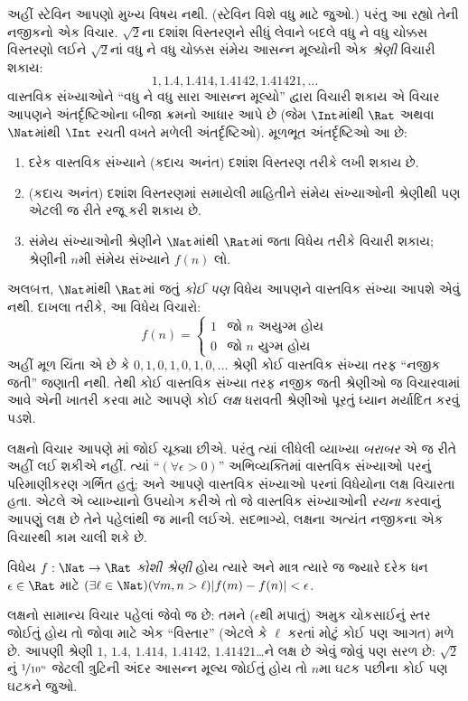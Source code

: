 અહીં સ્ટેવિન આપણો મુખ્ય વિષય નથી. (સ્ટેવિન વિશે વધુ માટે
\citealt{KatzKatz2012} જુઓ.) પરંતુ આ રહ્યો તેની નજીકનો એક વિચાર.
$\sqrt{2}$ના દશાંશ વિસ્તરણને સીધું લેવાને બદલે વધુ ને વધુ ચોક્કસ
વિસ્તરણો લઈને $\sqrt{2}$નાં વધુ ને વધુ ચોક્કસ સંમેય આસન્ન મૂલ્યોની
એક \emph{શ્રેણી} વિચારી શકાય:
\[
1, 1.4, 1.414, 1.4142, 1.41421,\ldots
\]
વાસ્તવિક સંખ્યાઓને ``વધુ ને વધુ સારા આસન્ન મૂલ્યો'' દ્વારા વિચારી
શકાય એ વિચાર આપણને અંતર્દૃષ્ટિઓના બીજા ક્રમનો આધાર આપે છે (જેમ
$\Int$માંથી $\Rat$ અથવા $\Nat$માંથી $\Int$ રચતી વખતે મળેલી
અંતર્દૃષ્ટિઓ). મૂળભૂત અંતર્દૃષ્ટિઓ આ છે:
\begin{enumerate}
	\item દરેક વાસ્તવિક સંખ્યાને (કદાચ અનંત) દશાંશ વિસ્તરણ તરીકે લખી
	શકાય છે.
	\item (કદાચ અનંત) દશાંશ વિસ્તરણમાં સમાયેલી માહિતીને સંમેય સંખ્યાઓની
	શ્રેણીથી પણ એટલી જ રીતે રજૂ કરી શકાય છે.
	\item સંમેય સંખ્યાઓની શ્રેણીને $\Nat$માંથી $\Rat$માં જતા વિધેય
	તરીકે વિચારી શકાય; શ્રેણીની $n$મી સંમેય સંખ્યાને $f(n)$ લો.
\end{enumerate}
અલબત્ત, $\Nat$માંથી $\Rat$માં જતું \emph{કોઈ પણ} વિધેય આપણને વાસ્તવિક
સંખ્યા આપશે એવું નથી. દાખલા તરીકે, આ વિધેય વિચારો:
\[
	f(n) =\begin{cases}
			1 & \text{જો }n\text{ અયુગ્મ હોય}\\
			0 &\text{જો }n\text{ યુગ્મ હોય}
		\end{cases}
\]
અહીં મૂળ ચિંતા એ છે કે $0,1,0,1,0,1,0,\ldots$ શ્રેણી કોઈ વાસ્તવિક
સંખ્યા તરફ ``નજીક જતી'' જણાતી નથી. તેથી કોઈ વાસ્તવિક સંખ્યા તરફ
નજીક જતી શ્રેણીઓ જ વિચારવામાં આવે એની ખાતરી કરવા માટે આપણે કોઈ
\emph{લક્ષ} ધરાવતી શ્રેણીઓ પૂરતું ધ્યાન મર્યાદિત કરવું પડશે.

લક્ષનો વિચાર આપણે માં જોઈ ચૂક્યા છીએ.
પરંતુ ત્યાં લીધેલી વ્યાખ્યા \emph{બરાબર} એ જ રીતે અહીં લઈ શકીએ નહીં.
ત્યાં ``$(\forall \epsilon>0)$'' અભિવ્યક્તિમાં વાસ્તવિક સંખ્યાઓ પરનું
પરિમાણીકરણ ગર્ભિત હતું; અને આપણે વાસ્તવિક સંખ્યાઓ પરનાં વિધેયોના
લક્ષ વિચારતા હતા. એટલે એ વ્યાખ્યાનો ઉપયોગ કરીએ તો જે વાસ્તવિક સંખ્યાઓની
\emph{રચના} કરવાનું આપણું લક્ષ છે તેને પહેલાંથી જ માની લઈએ. સદભાગ્યે,
લક્ષના અત્યંત નજીકના એક વિચારથી કામ ચાલી શકે છે.
\begin{defn}
  વિધેય $f: \Nat \to \Rat$ \emph{કોશી શ્રેણી} હોય ત્યારે અને માત્ર
  ત્યારે જ જ્યારે દરેક ધન $\epsilon \in \Rat$ માટે $(\exists \ell \in
  \Nat)(\forall m, n > \ell)|f(m) - f(n)| < \epsilon$.
\end{defn}

લક્ષનો સામાન્ય વિચાર પહેલાં જેવો જ છે: તમને ($\epsilon$થી મપાતું)
અમુક ચોકસાઈનું સ્તર જોઈતું હોય તો જોવા માટે એક ``વિસ્તાર'' (એટલે કે
$\ell$ કરતાં મોટું કોઈ પણ આગત) મળે છે. આપણી શ્રેણી $1$, $1.4$,
$1.414$, $1.4142$, $1.41421$\ldots{}ને લક્ષ છે એવું જોવું પણ સરળ છે:
$\sqrt{2}$નું $\nicefrac{1}{10^{n}}$ જેટલી ત્રુટિની અંદર આસન્ન મૂલ્ય
જોઈતું હોય તો $n$મા ઘટક પછીના કોઈ પણ ઘટકને જુઓ.

